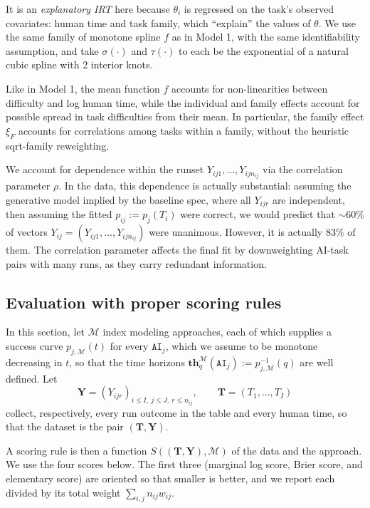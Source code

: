 \documentclass{article}
\theoremstyle{definition}
\newcommand{\thq}[1][q]{\mathbf{th}_{#1}}
\newcommand{\AI}{\texttt{AI}}
\begin{document}
It is an \emph{explanatory IRT} here because $\theta_i$ is regressed on the task's observed covariates: human time and task family, which ``explain'' the values of $\theta$. We use the same family of monotone spline $f$ as in Model 1, with the same identifiability assumption, and take $\sigma(\cdot)$ and $\tau(\cdot)$ to each be the exponential of a natural cubic spline with 2 interior knots. 

Like in Model 1, the mean function $f$ accounts for non-linearities between difficulty and log human time, while the individual and family effects account for possible spread in task difficulties from their mean. In particular, the family effect $\xi_F$ accounts for correlations among tasks within a family, without the heuristic sqrt-family reweighting. 

We account for dependence within the runset $Y_{ij1}, \dots, Y_{ijn_{ij}}$ via the correlation parameter $\rho$. In the data, this dependence is actually substantial: assuming the generative model implied by the baseline spec, where all $Y_{ijr}$ are independent, then assuming the fitted $p_{ij} := p_j(T_i)$ were correct, we would predict that $\sim 60\%$ of vectors $Y_{ij} = (Y_{ij1}, \dots, Y_{ijn_{ij}})$ were unanimous. However, it is actually 83\% of them. The correlation parameter affects the final fit by downweighting AI-task pairs with many runs, as they carry redundant information. 

\subsection{Evaluation with proper scoring rules}\label{sec:evaluation}

In this section, let $\mathcal{M}$ index modeling approaches, each of which supplies a success curve $p_{j, \mathcal{M}}(t)$ for every $\AI_j$, which we assume to be monotone decreasing in $t$, so that the time horizons $\thq^{\mathcal{M}}(\AI_j) := p_{j, \mathcal{M}}^{-1}(q)$ are well defined. Let
\[
    \mathbf{Y} = (Y_{ijr})_{i \leq I,\ j \leq J,\ r \leq n_{ij}},
    \qquad
    \mathbf{T} = (T_1, \dots, T_I)
\]
collect, respectively, every run outcome in the table and every human time, so that the dataset is the pair $(\mathbf{T}, \mathbf{Y})$. 

A scoring rule is then a function $S((\mathbf{T}, \mathbf{Y}), \mathcal{M})$ of the data and the approach. We use the four scores below. The first three (marginal log score, Brier score, and elementary score) are oriented so that smaller is better, and we report each divided by its total weight $\sum_{i,j} n_{ij} w_{ij}$.
\end{document}
